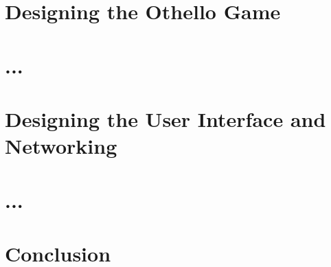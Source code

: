 \documentclass[a4wide, 11pt]{article}
\begin{document}
\pagebreak

\section{Designing the Othello Game}

\pagebreak
\section{...}
\pagebreak
\section{Designing the User Interface and Networking}
\pagebreak
\section{...}
\pagebreak
\section{Conclusion}
\end{document}
